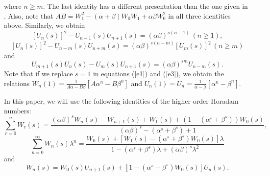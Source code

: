 \documentclass{kms-c}
\theoremstyle{plain}
\theoremstyle{definition}
\theoremstyle{remark}
\begin{document}
where $n\geq m$. The last identity has a different presentation than the one given in \cite{Kul}. Also, note that $AB=W_{1}^{2}-(\alpha+\beta)W_{0}W_{1}+\alpha\beta W_{0}^{2}$ in all three identities above. Similarly, we obtain
\[
\left[U_{n}(s)\right]^{2}-U_{n-1}(s)U_{n+1}(s)=(\alpha\beta)^{s(n-1)} \ (n\geq 1),
\]
\[
\left[U_{n}(s)\right]^{2}-U_{n-m}(s)U_{n+m}(s)=(\alpha\beta)^{s(n-m)}\left[U_{m}(s)\right]^{2} \ (n\geq m)
\]
and
\[
U_{m+1}(s)U_{n}(s)-U_{m}(s)U_{n+1}(s)=(\alpha\beta)^{sm}U_{n-m}(s).
\]
Note that if we replace $s=1$ in equations (\ref{e1}) and (\ref{e3}), we obtain the relations $W_{n}(1)=\frac{1}{A\alpha-B\beta}\left[A\alpha^{n}-B\beta^{n}\right]$ and $U_{n}(1)=U_{n}=\frac{1}{\alpha-\beta}\left[\alpha^{n}-\beta^{n}\right]$.


In this paper, we will use the following identities of the higher order Horadam numbers:
\begin{equation}\label{id1}
\sum_{r=0}^{n}W_{r}(s)=\frac{(\alpha\beta)^{s}W_{n}(s)-W_{n+1}(s)+W_{1}(s)+\left(1-(\alpha^{s}+\beta^{s})\right)W_{0}(s)}{(\alpha\beta)^{s}-(\alpha^{s}+\beta^{s})+1},
\end{equation}
\begin{equation}\label{id2}
\sum_{n=0}^{\infty}W_{n}(s)\lambda^{n}=\frac{W_{0}(s)+\left[W_{1}(s)-(\alpha^{s}+\beta^{s})W_{0}(s)\right]\lambda}{1-(\alpha^{s}+\beta^{s})\lambda+(\alpha\beta)^{s}\lambda^{2}}
\end{equation}
and
\begin{equation}\label{id3}
W_{n}(s)=W_{0}(s)U_{n+1}(s)+\left[1-(\alpha^{s}+\beta^{s})W_{0}(s)\right]U_{n}(s).
\end{equation}
\end{document}
